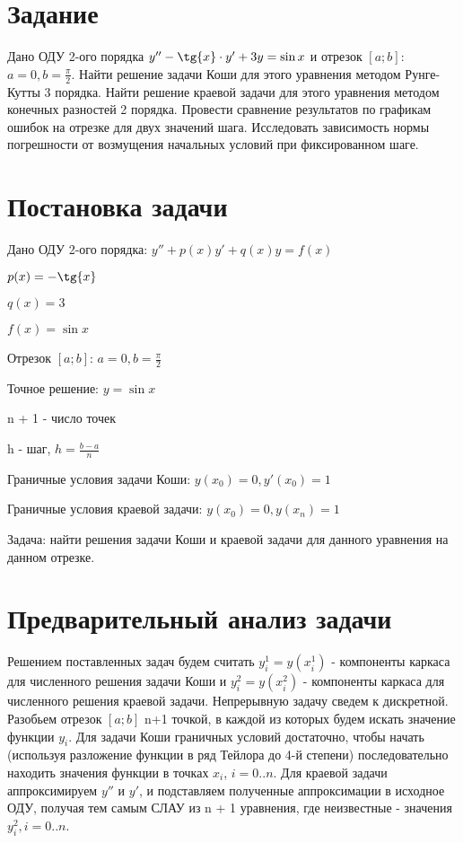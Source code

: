 \documentclass{article}
\begin{document}
	\newpage
	
	\section{Задание}
	
	Дано ОДУ 2-ого порядка $y'' - \tg{x}\cdot y' + 3y = \sin{x}$ и отрезок $[a;b]$: $a = 0, b = \frac{\pi}{2}$. Найти решение задачи Коши для этого уравнения методом Рунге-Кутты 3 порядка. Найти решение краевой задачи для этого уравнения методом конечных разностей 2 порядка. Провести сравнение результатов по графикам ошибок на отрезке для двух значений шага. Исследовать зависимость нормы погрешности от возмущения начальных условий при фиксированном шаге.
	
	\section{Постановка задачи}
	Дано ОДУ 2-ого порядка: $y'' + p(x)y' + q(x)y = f(x)$ \par
	$p(x) = - \tg{x}$\par
	$q(x) = 3$\par
	$f(x) = \sin{x}$\par
	Отрезок $[a;b]$: $a = 0, b = \frac{\pi}{2}$ \par
	Точное решение: $y=\sin{x}$\par
	n + 1 - число точек\par
	h - шаг, $h=\frac{b-a}{n}$\par
	Граничные условия задачи Коши: $y(x_0) = 0, y'(x_0) = 1$ \par
	Граничные условия краевой задачи: $y(x_0) = 0, y(x_n) = 1$ \par
	Задача: найти решения задачи Коши и краевой задачи для данного уравнения на данном отрезке.
	\begin{comment}
	Задача: найти $y_i^1 = y(x_i^1)$ - компоненты каркаса для численного решения задачи Коши и $y_i^2 = y(x_i^2)$ - компоненты каркаса для численного решения краевой задачи.
	\end{comment}   
	
	\section{Предварительный анализ задачи}
	Решением поставленных задач будем считать $y_i^1 = y(x_i^1)$ - компоненты каркаса для численного решения задачи Коши и $y_i^2 = y(x_i^2)$ - компоненты каркаса для численного решения краевой задачи. Непрерывную задачу сведем к дискретной. Разобьем отрезок $[a;b]$ n+1 точкой, в каждой из которых будем искать значение функции $y_i$. Для задачи Коши граничных условий достаточно, чтобы начать (используя разложение функции в ряд Тейлора до 4-й степени) последовательно находить значения функции в точках $x_i$, $i=0..n$. Для краевой задачи аппроксимируем $y''$ и $y'$, и подставляем полученные аппроксимации в исходное ОДУ, получая тем самым СЛАУ из n + 1 уравнения, где неизвестные - значения $y_i^2, i = 0..n$.
	
\end{document}

